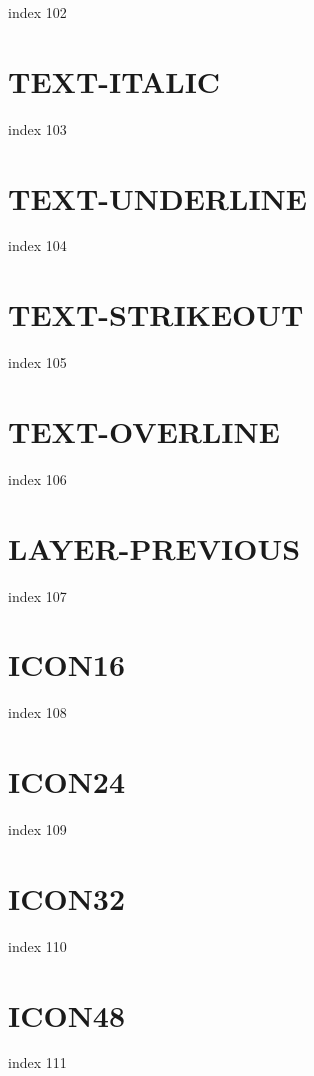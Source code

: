 \documentclass[10pt]{report}
\begin{document}
index 102

\section{TEXT-ITALIC}

index 103

\section{TEXT-UNDERLINE}

index 104

\section{TEXT-STRIKEOUT}

index 105

\section{TEXT-OVERLINE}

index 106

\section{LAYER-PREVIOUS}

index 107

\section{ICON16}

index 108

\section{ICON24}

index 109

\section{ICON32}

index 110

\section{ICON48}

index 111
\end{document}
